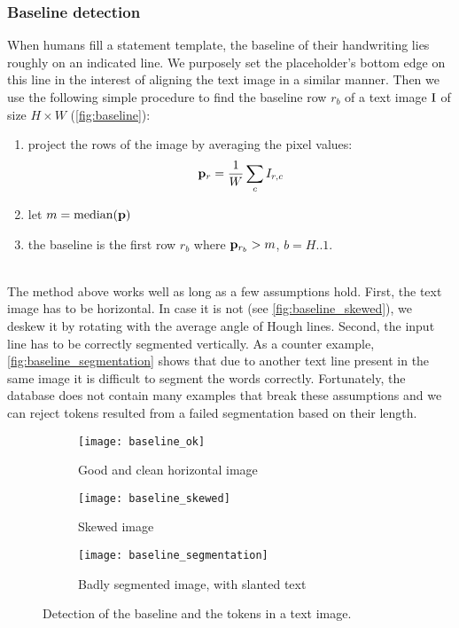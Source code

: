 
		\subsubsection*{Baseline detection}
			When humans fill a statement template, the baseline of their handwriting lies roughly on an indicated line.  We purposely set the placeholder's bottom edge on this line in the interest of aligning the text image in a similar manner. Then we use the following simple procedure to find the baseline row \(r_b\) of a text image \(\mathrm{I}\) of size \(H \times W\) (\autoref{fig:baseline}):
			\noindent\begin{minipage}{\linewidth}
			\begin{enumerate}
				\item project the rows of the image by averaging the pixel values: \[
					\mathbf{p}_r = \frac{1}{W} \sum_c I_{r,c}
				\]
				\item let \(m = \operatorname{median}(\mathbf{p})\)
				\item the baseline is the first row \(r_b\) where \(\mathbf{p}_{r_b} > m\), \(b = H..1\).
			\end{enumerate}
			\end{minipage}\\

			The method above works well as long as a few assumptions hold. First, the text image has to be horizontal. In case it is not (see \autoref{fig:baseline_skewed}), we deskew it by rotating with the average angle of Hough lines. Second, the input line has to be correctly segmented vertically. As a counter example, \autoref{fig:baseline_segmentation} shows that due to another text line present in the same image it is difficult to segment the words correctly. Fortunately, the database does not contain many examples that break these assumptions and we can reject tokens resulted from a failed segmentation based on their length.

			\begin{figure}
				\begin{subfigure}{\linewidth}
					\texttt{[image: baseline\_ok]}
					\caption{Good and clean horizontal image}
					\label{fig:baseline_ok}
				\end{subfigure}
				\bigskip

				\begin{subfigure}{\linewidth}
					\texttt{[image: baseline\_skewed]}
					\caption{Skewed image}
					\label{fig:baseline_skewed}
				\end{subfigure}
				\bigskip

				\begin{subfigure}{\linewidth}
					\texttt{[image: baseline\_segmentation]}
					\caption{Badly segmented image, with slanted text}
					\label{fig:baseline_segmentation}
				\end{subfigure}
				\caption[Baseline and tokens]{Detection of the baseline and the tokens in a text image.}
				\label{fig:baseline}
			\end{figure}

